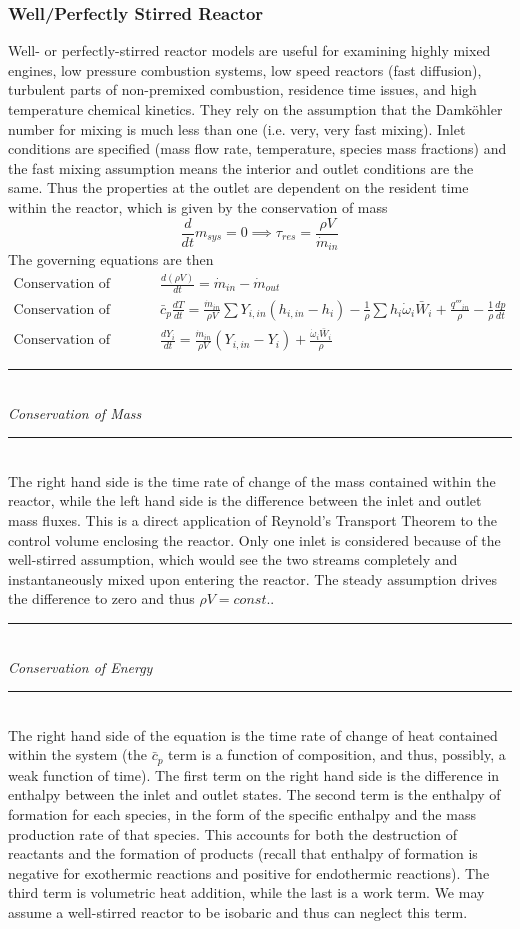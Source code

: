 \documentclass[11pt]{article}
\newcommand{\Header}[1]{\noindent\rule{\textwidth}{0.4pt}\\[0.3cm]\indent \large{\textit{#1}}\normalsize{}\\[-0.1cm]\noindent\rule{\textwidth}{0.4pt}}
\begin{document}
\subsubsection{Well/Perfectly Stirred Reactor}
Well- or perfectly-stirred reactor models are useful for examining highly mixed engines, low pressure combustion systems, low speed reactors (fast diffusion), turbulent parts of non-premixed combustion, residence time issues, and high temperature chemical kinetics. They rely on the assumption that the Damk{\"o}hler number for mixing is much less than one (i.e. very, very fast mixing). Inlet conditions are specified (mass flow rate, temperature, species mass fractions) and the fast mixing assumption means the interior and outlet conditions are the same. Thus the properties at the outlet are dependent on the resident time within the reactor, which is given by the conservation of mass
$$\frac{d}{dt}m_{sys} = 0\implies \tau_{res} = \frac{\rho V}{\dot m_{in}}$$
The governing equations are then
\begin{align*}
\textrm{Conservation of Mass: } &\frac{d(\rho V)}{dt} = \dot m_{in} - \dot m_{out}\\
\textrm{Conservation of Energy: } &\bar c_p\frac{dT}{dt} = \frac{\dot m_{in}}{\rho V}\sum Y_{i,in}(h_{i,in}-h_i) - \frac{1}{\rho}\sum h_i\dot\omega_i\bar W_i  + \frac{q'''_{in}}{\rho}-\frac{1}{\rho}\frac{dp}{dt}\\
\textrm{Conservation of Species: } &\frac{dY_i}{dt} = \frac{\dot m_{in}}{\rho V}(Y_{i,in}-Y_i) + \frac{\dot\omega_i\bar W_i}{\rho}
\end{align*}

\Header{Conservation of Mass}\\

The right hand side is the time rate of change of the mass contained within the reactor, while the left hand side is the difference between the inlet and outlet mass fluxes. This is a direct application of Reynold's Transport Theorem to the control volume enclosing the reactor. Only one inlet is considered because of the well-stirred assumption, which would see the two streams completely and instantaneously mixed upon entering the reactor. The steady assumption drives the difference to zero and thus $\rho V = const.$.

\Header{Conservation of Energy}\\

The right hand side of the equation is the time rate of change of heat contained within the system (the $\bar c_p$ term is a function of composition, and thus, possibly, a weak function of time). The first term on the right hand side is the difference in enthalpy between the inlet and outlet states. The second term is the enthalpy of formation for each species, in the form of the specific enthalpy and the mass production rate of that species. This accounts for both the destruction of reactants and the formation of products (recall that enthalpy of formation is negative for exothermic reactions and positive for endothermic reactions). The third term is volumetric heat addition, while the last is a work term. We may assume a well-stirred reactor to be isobaric and thus can neglect this term.
\end{document}
